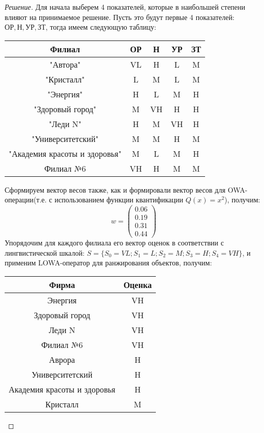 \documentclass[11pt,a4paper,oneside]{article}
\newenvironment{solution}{
	\begin{proof}[Решение]
		\vspace{-8px}
		\setlength{\parskip}{4px}
		\setlength{\parindent}{0px}
	}{
	\end{proof}
}
\begin{document}
	\begin{solution}
		Для начала выберем 4 показателей, которые в наибольшей степени влияют на принимаемое решение. Пусть это будут первые 4 показателей: $ОР, Н, УР, ЗТ$, тогда имеем следующую таблицу:
		\begin{table}[!hbtp]
			\begin{tabular}{|c|c|c|c|c|}
				\hline
				Филиал                        & ОР & Н  & УР & ЗТ  \\ \hline
				"Автора"                      & VL & H  & L  & M   \\ \hline
				"Кристалл"                    & L  & M  & L  & M    \\ \hline
				"Энергия"                     & H  & L  & M  & H    \\ \hline
				"Здоровый город"              & M  & VH & H  & H    \\ \hline
				"Леди N"                      & H  & M  & VH & H   \\ \hline
				"Университетский"             & M  & M  & H  & M    \\ \hline
				"Академия красоты и здоровья" & M  & L  & M  & H    \\ \hline
				Филиал №6                     & VH & H  & M  & M    \\ \hline
			\end{tabular}
		\end{table}
		Сформируем вектор весов также, как и формировали вектор весов для OWA-операции(т.е. с использованием функции квантификации $ Q(x) = x^2 $), получим:
		\[
		w = 
		\begin{pmatrix} 0.06 \\ 0.19 \\ 0.31 \\ 0.44 \end{pmatrix}
		\]
		Упорядочим для каждого филиала его вектор оценок в соответствии с лингвистической шкалой:
		$ S = \{ S_0 = VL; S_1 = L; S_2 = M; S_3 = H; S_4 = VH \} $, и применим LOWA-оператор для ранжирования объектов, получим:
		\begin{table}[!hbtp]
			\centering
			\begin{tabular}{|c|c|}
				\hline
				Фирма & Оценка   \\ \hline
				Энергия & VH    \\ \hline
				Здоровый город &  VH  \\ \hline
				Леди N & VH  \\ \hline
				Филиал №6&  VH  \\ \hline
				Аврора & H \\ \hline
				Университетский & H  \\ \hline
				Академия красоты и здоровья & H  \\ \hline
				Кристалл & M \\ \hline
			\end{tabular}
		\end{table}
		\newline
	\end{solution}
\end{document}
